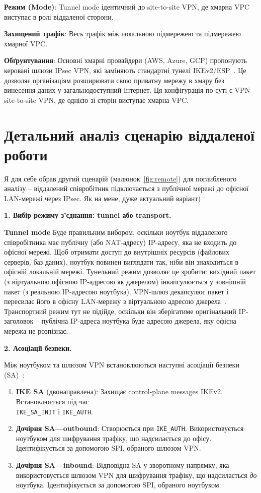 \textbf{Режим (Mode)}: Tunnel mode ідентичний до site-to-site VPN, де хмарна VPC виступає в ролі віддаленої сторони.

\textbf{Захищений трафік}: Весь трафік між локальною підмережею та підмережею хмарної VPC.

\textbf{Обґрунтування}: Основні хмарні провайдери (AWS, Azure, GCP) пропонують керовані шлюзи IPsec VPN, які заміняють 
стандартні тунелі IKEv2/ESP~\cite{aws_vpn_docs, azure_vpn_docs}. Це дозволяє організаціям розширювати свою 
приватну мережу в хмару без винесення даних у загальнодоступний Інтернет. Ця конфігурація по суті є VPN site-to-site 
VPN, де однією зі сторін виступає хмарна VPC.

\section{Детальний аналіз сценарію віддаленої роботи}
\label{sec:task3}

Я для себе обрав другий сценарій (малюнок~\ref{fig:remote}) для поглибленого аналізу -- віддалений співробітник 
підключається з публічної мережі до офісної LAN-мережі через IPsec. Як на мене, дуже актуальний варіант)

\textbf{1. Вибір режиму з'єднання: tunnel або transport.}

\textbf{Tunnel mode} Буде правильним вибором, оскільки ноутбук віддаленого співробітника має публічну (або 
NAT-адресу) IP-адресу, яка не входить до офісної мережі. Щоб отримати доступ до внутрішніх ресурсів (файлових 
серверів, баз даних), ноутбук повинен виглядати так, ніби він знаходиться в офісній локальній мережі. Тунельний 
режим дозволяє це зробити: вихідний пакет (з віртуальною офісною IP-адресою як джерелом) інкапсулюється у 
зовнішній пакет (з реальною IP-адресою ноутбука). VPN-шлюз декапсулює пакет і пересилає його в офісну LAN-мережу 
з віртуальною адресою джерела~\cite{rfc4301}. Транспортний режим тут не підійде, оскільки він зберігатиме оригінальний 
IP-заголовок -- публічна IP-адреса ноутбука буде адресою джерела, яку офісна мережа не розпізнає.

\textbf{2. Асоціації безпеки.}

Між ноутбуком та шлюзом VPN встановлюються наступні асоціації безпеки (SA)~\cite{rfc7296}:

\begin{enumerate}
    \item \textbf{IKE SA} (двонаправлена): Захищає control-plane messages IKEv2. 
        Встановлюється під час \\ \texttt{IKE\_SA\_INIT} і \texttt{IKE\_AUTH}.
    \item \textbf{Дочірня SA---outbound}: Створюється при \texttt{IKE\_AUTH}. 
        Використовується ноутбуком для шифрування трафіку, що надсилається до офісу. Ідентифікується за допомогою 
        SPI, обраного шлюзом VPN.
    \item \textbf{Дочірня SA---inbound}: Відповідна SA у зворотному напрямку, яка використовується шлюзом VPN 
    для шифрування трафіку, що надсилається \textit{до} ноутбука. Ідентифікується за допомогою SPI, обраного ноутбуком.
\end{enumerate}

